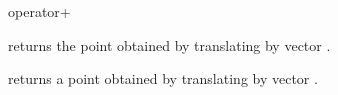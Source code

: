 
\begin{ccRefFunction}{operator+}

       {returns the point obtained by translating  by 
        vector .}

       {returns a point obtained by translating  by 
        vector .}
\end{ccRefFunction}

